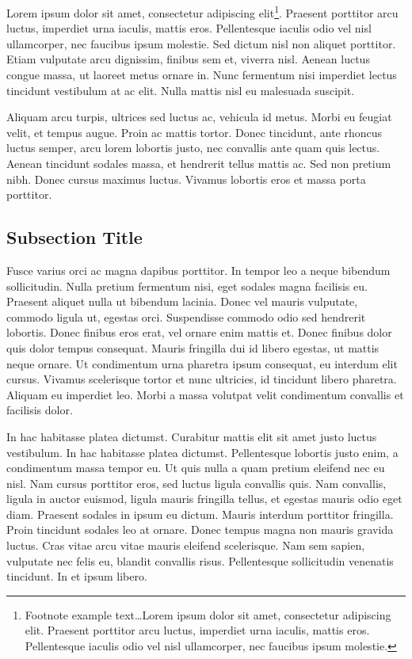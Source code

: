 \documentclass[
	11pt, %
	fleqn, %
	a4paper, %
]{LegrandOrangeBook}
\begin{document}
Lorem ipsum dolor sit amet, consectetur adipiscing elit\footnote{Footnote example text\ldots Lorem ipsum dolor sit amet, consectetur adipiscing elit. Praesent porttitor arcu luctus, imperdiet urna iaculis, mattis eros. Pellentesque iaculis odio vel nisl ullamcorper, nec faucibus ipsum molestie.}. Praesent porttitor arcu luctus, imperdiet urna iaculis, mattis eros. Pellentesque iaculis odio vel nisl ullamcorper, nec faucibus ipsum molestie. Sed dictum nisl non aliquet porttitor. Etiam vulputate arcu dignissim, finibus sem et, viverra nisl. Aenean luctus congue massa, ut laoreet metus ornare in. Nunc fermentum nisi imperdiet lectus tincidunt vestibulum at ac elit. Nulla mattis nisl eu malesuada suscipit.

Aliquam arcu turpis, ultrices sed luctus ac, vehicula id metus. Morbi eu feugiat velit, et tempus augue. Proin ac mattis tortor. Donec tincidunt, ante rhoncus luctus semper, arcu lorem lobortis justo, nec convallis ante quam quis lectus. Aenean tincidunt sodales massa, et hendrerit tellus mattis ac. Sed non pretium nibh. Donec cursus maximus luctus. Vivamus lobortis eros et massa porta porttitor.

\subsection{Subsection Title}

Fusce varius orci ac magna dapibus porttitor. In tempor leo a neque bibendum sollicitudin. Nulla pretium fermentum nisi, eget sodales magna facilisis eu. Praesent aliquet nulla ut bibendum lacinia. Donec vel mauris vulputate, commodo ligula ut, egestas orci. Suspendisse commodo odio sed hendrerit lobortis. Donec finibus eros erat, vel ornare enim mattis et. Donec finibus dolor quis dolor tempus consequat. Mauris fringilla dui id libero egestas, ut mattis neque ornare. Ut condimentum urna pharetra ipsum consequat, eu interdum elit cursus. Vivamus scelerisque tortor et nunc ultricies, id tincidunt libero pharetra. Aliquam eu imperdiet leo. Morbi a massa volutpat velit condimentum convallis et facilisis dolor.

In hac habitasse platea dictumst. Curabitur mattis elit sit amet justo luctus vestibulum. In hac habitasse platea dictumst. Pellentesque lobortis justo enim, a condimentum massa tempor eu. Ut quis nulla a quam pretium eleifend nec eu nisl. Nam cursus porttitor eros, sed luctus ligula convallis quis. Nam convallis, ligula in auctor euismod, ligula mauris fringilla tellus, et egestas mauris odio eget diam. Praesent sodales in ipsum eu dictum. Mauris interdum porttitor fringilla. Proin tincidunt sodales leo at ornare. Donec tempus magna non mauris gravida luctus. Cras vitae arcu vitae mauris eleifend scelerisque. Nam sem sapien, vulputate nec felis eu, blandit convallis risus. Pellentesque sollicitudin venenatis tincidunt. In et ipsum libero.
\end{document}
